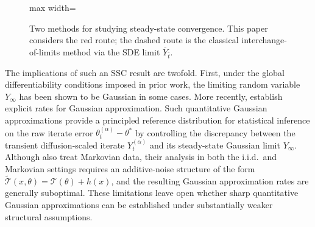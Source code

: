 \documentclass[11pt,letterpaper]{article}
\theoremstyle{plain}
\theoremstyle{definition}
\theoremstyle{remark}
\newcommand{\mT}{\mathcal{T}}
\newcommand{\tmT}{\widetilde{\mT}}
\begin{document}
\begin{figure}[htbp!]
    \centering
     \begin{adjustbox}{max width=\linewidth}
\end{adjustbox}
    \caption{Two methods for studying steady-state convergence. This paper considers the red route; the dashed route is the classical interchange-of-limits method via the SDE limit $\overline Y_{\bar t}$.
    }
    \label{fig:limit-plot}
\end{figure}


The implications of such an SSC result are twofold.
First, under the global differentiability conditions imposed in prior work, the limiting random variable $Y_\infty$ has been shown to be
Gaussian \citep{chen2022stationary} in some cases. More recently,
\cite{wang2026steady} establish explicit rates for Gaussian approximation.
Such quantitative Gaussian approximations provide a principled reference
distribution for statistical inference on the raw iterate error
$\theta_t^{(\alpha)}-\theta^*$ by controlling the discrepancy between the
transient diffusion-scaled iterate $Y_t^{(\alpha)}$ and its steady-state
Gaussian limit $Y_\infty$. Although \cite{wang2026steady} also treat
Markovian data, their analysis in both the i.i.d.\ and Markovian settings
requires an additive-noise structure of the form
$\tmT(x,\theta)=\mT(\theta)+h(x)$, and the resulting Gaussian approximation
rates are generally suboptimal. These limitations leave open whether sharp
quantitative Gaussian approximations can be established  under substantially weaker structural assumptions.
\end{document}
